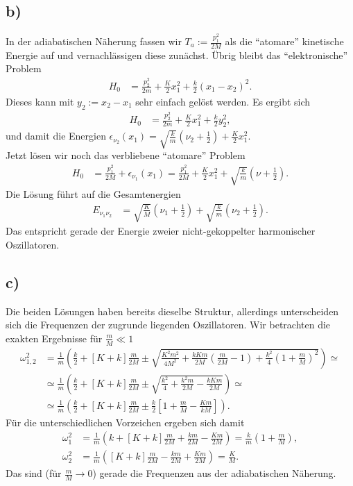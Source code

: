 \documentclass[english, parskip=full]{scrartcl}
\newcommand{\kla}{}
\newcommand{\klam}{}
\begin{document}
\subsection*{b)}
In der adiabatischen Näherung fassen wir $T_a := \frac{p_1^2}{2M}$ als die ``atomare'' kinetische Energie auf und vernachlässigen diese zunächst.
Übrig bleibt das ``elektronische'' Problem
\begin{align}
H_0 &= \frac{p_2^2}{2m} + \frac{K}{2}x_1^2 + \frac{k}{2}(x_1 - x_2)^2.
\end{align}
Dieses kann mit $y_2 := x_2 - x_1$ sehr einfach gelöst werden.
Es ergibt sich
\begin{align}
H_0 &= \frac{p_2^2}{2m} + \frac{K}{2}x_1^2 + \frac{k}{2}y_2^2,
\end{align}
und damit die Energien $\epsilon_{\nu_2}(x_1) = \sqrt{\frac{k}{m}}\kla\left( \nu_2 + \frac{1}{2} \right) + \frac{K}{2}x_1^2$.
\\
Jetzt lösen wir noch das verbliebene ``atomare'' Problem
\begin{align}
H_0 &= \frac{p_1^2}{2M} + \epsilon_{\nu_1}(x_1) = \frac{p_1^2}{2M} + \frac{K}{2}x_1^2 + \sqrt{\frac{k}{m}}\kla\left( \nu + \frac{1}{2} \right).
\end{align}
Die Lösung führt auf die Gesamtenergien
\begin{align}
E_{\nu_1\nu_2} &= \sqrt{\frac{K}{M}}\kla\left( \nu_1 + \frac{1}{2} \right) + \sqrt{\frac{k}{m}}\kla\left( \nu_2 + \frac{1}{2} \right).
\end{align}
Das entspricht gerade der Energie zweier nicht-gekoppelter harmonischer Oszillatoren.

\subsection*{c)}
Die beiden Lösungen haben bereits dieselbe Struktur, allerdings unterscheiden sich die Frequenzen der zugrunde liegenden Oszillatoren.
Wir betrachten die exakten Ergebnisse für $\frac{m}{M} \ll 1$
\begin{align}
\omega_{1,2}^2 &= \frac{1}{m} \kla\left( \frac{k}{2} + [K+k]\frac{m}{2M} \pm \sqrt{\frac{K^2m^2}{4M^2} + \frac{kKm}{2M} \kla\left( \frac{m}{2M} - 1 \right) + \frac{k^2}{4} \kla\left( 1 + \frac{m}{M} \right)^2} \right) \simeq \\
&\simeq \frac{1}{m} \kla\left( \frac{k}{2} + [K+k]\frac{m}{2M} \pm \sqrt{\frac{k^2}{4} + \frac{k^2m}{2M} - \frac{kKm}{2M}} \right) \simeq \\
&\simeq \frac{1}{m} \kla\left( \frac{k}{2} + [K+k]\frac{m}{2M} \pm \frac{k}{2} \klam\left[ 1 + \frac{m}{M} - \frac{Km}{kM}\right] \right).
\end{align}
Für die unterschiedlichen Vorzeichen ergeben sich damit
\begin{align}
\omega_1^2 &= \frac{1}{m} \kla\left( k + [K+k]\frac{m}{2M} + \frac{km}{2M} - \frac{Km}{2M} \right) = \frac{k}{m} \kla\left( 1  + \frac{m}{M} \right),\\
\omega_2^2 &= \frac{1}{m} \kla\left( [K+k]\frac{m}{2M} - \frac{km}{2M} + \frac{Km}{2M} \right) = \frac{K}{M}.
\end{align}
Das sind (für $\frac{m}{M} \rightarrow 0$) gerade die Frequenzen aus der adiabatischen Näherung.
\end{document}
